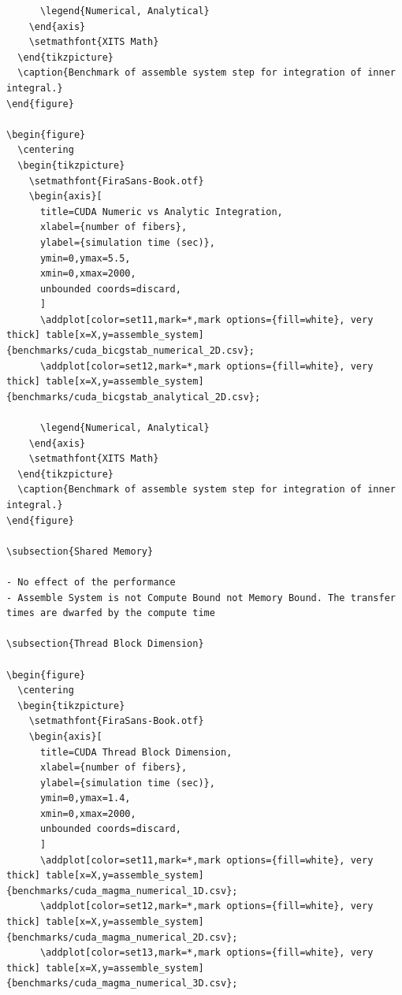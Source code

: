 \documentclass[a4paper,11pt]{kth-mag}
\begin{document}
\begin{listing}
\begin{verbatim}
      \legend{Numerical, Analytical}
    \end{axis}
    \setmathfont{XITS Math}
  \end{tikzpicture}
  \caption{Benchmark of assemble system step for integration of inner integral.}
\end{figure}

\begin{figure}
  \centering
  \begin{tikzpicture}
    \setmathfont{FiraSans-Book.otf}
    \begin{axis}[
      title=CUDA Numeric vs Analytic Integration,
      xlabel={number of fibers},
      ylabel={simulation time (sec)},
      ymin=0,ymax=5.5,
      xmin=0,xmax=2000,
      unbounded coords=discard,
      ]
      \addplot[color=set11,mark=*,mark options={fill=white}, very thick] table[x=X,y=assemble_system] {benchmarks/cuda_bicgstab_numerical_2D.csv};
      \addplot[color=set12,mark=*,mark options={fill=white}, very thick] table[x=X,y=assemble_system] {benchmarks/cuda_bicgstab_analytical_2D.csv};

      \legend{Numerical, Analytical}
    \end{axis}
    \setmathfont{XITS Math}
  \end{tikzpicture}
  \caption{Benchmark of assemble system step for integration of inner integral.}
\end{figure}

\subsection{Shared Memory}

- No effect of the performance
- Assemble System is not Compute Bound not Memory Bound. The transfer times are dwarfed by the compute time

\subsection{Thread Block Dimension}

\begin{figure}
  \centering
  \begin{tikzpicture}
    \setmathfont{FiraSans-Book.otf}
    \begin{axis}[
      title=CUDA Thread Block Dimension,
      xlabel={number of fibers},
      ylabel={simulation time (sec)},
      ymin=0,ymax=1.4,
      xmin=0,xmax=2000,
      unbounded coords=discard,
      ]
      \addplot[color=set11,mark=*,mark options={fill=white}, very thick] table[x=X,y=assemble_system] {benchmarks/cuda_magma_numerical_1D.csv};
      \addplot[color=set12,mark=*,mark options={fill=white}, very thick] table[x=X,y=assemble_system] {benchmarks/cuda_magma_numerical_2D.csv};
      \addplot[color=set13,mark=*,mark options={fill=white}, very thick] table[x=X,y=assemble_system] {benchmarks/cuda_magma_numerical_3D.csv};


\end{verbatim}
\end{listing}
\end{document}
